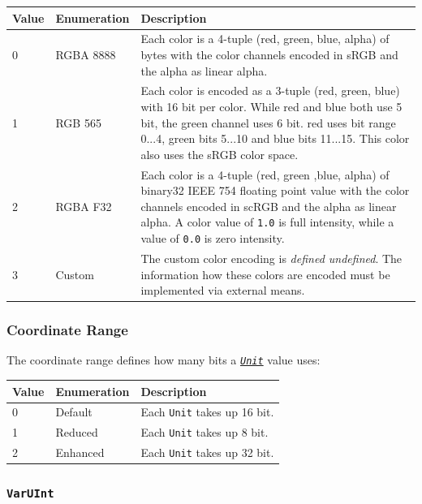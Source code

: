 \documentclass[]{article}
\newcommand{\link}[2]{\hyperlink{#1}{\emph{#2}}}
\begin{document}
\begin{longtable}[]{@{}p{0.5in}p{1in}p{4.5in}@{}}
\toprule
Value & Enumeration & Description \\
\midrule
\endhead
0 & RGBA 8888 & Each color is a 4-tuple (red, green, blue, alpha) of bytes with the color channels encoded in sRGB and the alpha as linear alpha. \\
1 & RGB 565 & Each color is encoded as a 3-tuple (red, green, blue) with 16 bit per color. While red and blue both use 5 bit, the green channel uses 6 bit. red uses bit range 0...4, green bits 5...10 and blue bits 11...15. This color also uses the sRGB color space.\\
2 & RGBA F32 & Each color is a 4-tuple (red, green ,blue, alpha) of binary32 IEEE 754 floating point value with the color channels encoded in scRGB and the alpha as linear alpha. A color value of \texttt{1.0} is full intensity, while a value of \texttt{0.0} is zero intensity. \\
3 & Custom & The custom color encoding is \emph{defined undefined}. The information how these colors are encoded must be implemented via external means. \\
\bottomrule
\end{longtable}

\hypertarget{coordinate-range}{\subsubsection{Coordinate Range}\label{coordinate-range}}

The coordinate range defines how many bits a
\link{units}{\texttt{Unit}} value uses:

\begin{longtable}[]{@{}p{1in}p{2in}p{3in}@{}}
\toprule
Value & Enumeration & Description \\
\midrule
\endhead
0 & Default & Each \texttt{Unit} takes up 16 bit. \\
1 & Reduced & Each \texttt{Unit} takes up 8 bit. \\
2 & Enhanced & Each \texttt{Unit} takes up 32 bit. \\
\bottomrule
\end{longtable}

\hypertarget{varuint}{\subsubsection{\texorpdfstring{\texttt{VarUInt}}{VarUInt}}\label{varuint}}
\end{document}
